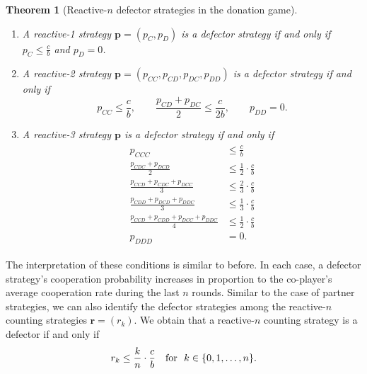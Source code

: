 \documentclass[9pt,twoside,lineno]{pnas-new}
\theoremstyle{plainCl1}
\newtheorem{theorem}{Theorem}
\theoremstyle{plainCl2}
\begin{document}
\begin{theorem}[Reactive-$n$ defector strategies in the donation game] \label{theorem:reactive_defecting_strategies}
~\\[-0.8cm]
\begin{enumerate}
\item A reactive-1 strategy $\mathbf{p}\!=\!(p_C,p_D)$ is a defector strategy if and only if
~$p_{C} \!\le\!  \frac{c}{b}$ and $p_{D} \!=\! 0$.

\item A reactive-2 strategy $\mathbf{p}\!=\!(p_{CC},p_{CD},p_{DC},p_{DD})$ is a defector strategy if and only if
\begin{equation}\label{eq:defecting_conditions_two}
  p_{CC} \le \frac{c}{b}, \qquad \displaystyle \frac{p_{CD} \!+\! p_{DC}}{2} \le \frac{c}{2b}, \qquad p_{DD} = 0.
\end{equation}
\item A reactive-3 strategy $\mathbf{p}$ is a defector strategy if and only if
\begin{align}\label{eq:defecting_conditions_three}
  \begin{split}
  p_{CCC} & \le \frac{c}{b} \\
  \frac{p_{CDC} + p_{DCD}}{2} & \leq \frac{1}{2} \cdot \frac{c}{b} \\
  \frac{p_{CCD} + p_{CDC} + p_{DCC}}{3} & \leq \frac{2}{3} \cdot \frac{c}{b} \\
  \frac{p_{CDD} + p_{DCD} + p_{DDC}}{3} & \leq \frac{1}{3} \cdot \frac{c}{b} \\
  \frac{p_{CCD} + p_{CDD} + p_{DCC} + p_{DDC}}{4}  & \leq \frac{1}{2} \cdot \frac{c}{b}  \\
  p_{DDD} & = 0.
  \end{split}
\end{align}
\end{enumerate}
\end{theorem}

\noindent
The interpretation of these conditions is similar to before. 
In each case, a defector strategy's cooperation probability increases in proportion to the co-player's average cooperation rate during the last $n$ rounds. 
Similar to the case of partner strategies, we can also identify the defector strategies among the reactive-$n$ counting strategies $\mathbf{r}=(r_k)$. 
We obtain that a reactive-$n$ counting strategy is a defector if and only if 
\begin{equation} \label{Eq:DefectorCounting}
r_{k} \le  \frac{k}{n} \cdot \frac{c}{b} ~~~\text{\normalfont for }~ k \in \{0, 1, \dots, n\}.
\end{equation}
\end{document}
